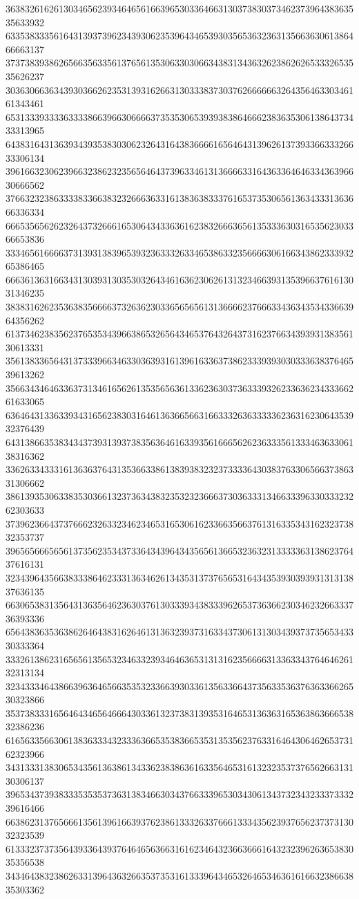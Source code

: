 36383261626130346562393464656166396530336466313037383037346237396438363535633932
63353833356164313937396234393062353964346539303565363236313566363061386466663137
37373839386265663563356137656135306330306634383134363262386262653332653535626237
30363066363439303662623531393162663130333837303762666666326435646330346161343461
65313339333363333866396630666637353530653939383864666238363530613864373433313965
64383164313639343935383030623264316438366661656464313962613739336633326633306134
39616632306239663238623235656464373963346131366663316436336464633436396630666562
37663232386333383366383232666363316138363833376165373530656136343331363666336334
66653565626232643732666165306434336361623832666365613533363031653562303366653836
33346561666637313931383965393236333263346538633235666630616634386233393265386465
66636136316634313039313035303264346163623062613132346639313539663761613031346235
38383162623536383566663732636230336565656131366662376663343634353433663964356262
61373462383562376535343966386532656434653764326437316237663439393138356130613331
35613833656431373339663463303639316139616336373862333939303033363837646539613262
35663434646336373134616562613535656361336236303736333932623363623433366261633065
63646431336339343165623830316461363665663166333263633333623631623064353932376439
64313866353834343739313937383563646163393561666562623633356133346363306138316362
33626334333161363637643135366338613839383232373333643038376330656637386331306662
38613935306338353036613237363438323532323666373036333134663339633033323262303633
37396236643737666232633234623465316530616233663566376131633534316232373832353737
39656566656561373562353437336434396434356561366532363231333336313862376437616131
32343964356638333864623331363462613435313737656531643435393039393131313837636135
66306538313564313635646236303761303339343833396265373636623034623266333736393336
65643836353638626464383162646131363239373163343730613130343937373565343330333364
33326138623165656135653234633239346463653131316235666631336334376464626132313134
32343334643866396364656635353233663930336135633664373563353637636336626530323866
35373833316564643465646664303361323738313935316465313636316536386366653832386236
61656335663061383633343233363665353836653531353562376331646430646265373162323966
34313331383065343561363861343362383863616335646531613232353737656266313130306137
39653437393833353535373631383466303437663339653034306134373234323337333239616466
66386231376566613561396166393762386133326337666133343562393765623737313032323539
61333237373564393364393764646563663161623464323663666164323239626365383035356538
34346438323862633139643632663537353161333964346532646534636161663238663835303362
